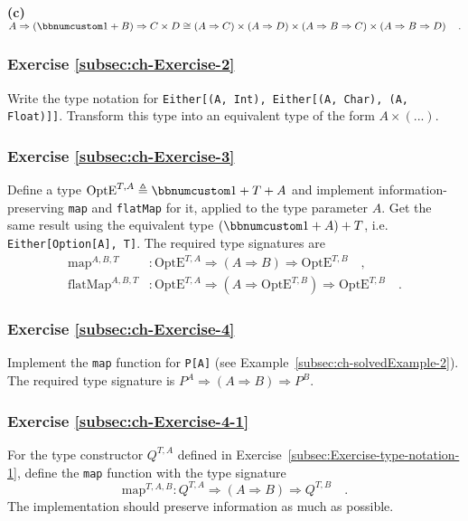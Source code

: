 \textbf{(c)} $A\Rightarrow\left(\bbnum 1+B\right)\Rightarrow C\times D\cong\left(A\Rightarrow C\right)\times\left(A\Rightarrow D\right)\times\left(A\Rightarrow B\Rightarrow C\right)\times\left(A\Rightarrow B\Rightarrow D\right)\quad.$

\subsubsection{Exercise \label{subsec:ch-Exercise-2}\ref{subsec:ch-Exercise-2}}

Write the type notation for \lstinline!Either[(A, Int), Either[(A, Char), (A, Float)]]!.
Transform this type into an equivalent type of the form $A\times(...)$.

\subsubsection{Exercise \label{subsec:ch-Exercise-3}\ref{subsec:ch-Exercise-3}}

Define a type $\text{OptE}^{T,A}\triangleq\bbnum 1+T+A$ and implement
information-preserving \lstinline!map! and \lstinline!flatMap! for
it, applied to the type parameter $A$. Get the same result using
the equivalent type $(\bbnum 1+A)+T$, i.e. \lstinline!Either[Option[A], T]!.
The required type signatures are
\begin{align*}
\text{map}^{A,B,T} & :\text{OptE}^{T,A}\Rightarrow\left(A\Rightarrow B\right)\Rightarrow\text{OptE}^{T,B}\quad,\\
\text{flatMap}^{A,B,T} & :\text{OptE}^{T,A}\Rightarrow(A\Rightarrow\text{OptE}^{T,B})\Rightarrow\text{OptE}^{T,B}\quad.
\end{align*}


\subsubsection{Exercise \label{subsec:ch-Exercise-4}\ref{subsec:ch-Exercise-4}}

Implement the \lstinline!map! function for \lstinline!P[A]! (see
Example~\ref{subsec:ch-solvedExample-2}). The required type signature
is $P^{A}\Rightarrow\left(A\Rightarrow B\right)\Rightarrow P^{B}$.

\subsubsection{Exercise \label{subsec:ch-Exercise-4-1}\ref{subsec:ch-Exercise-4-1}}

For the type constructor $Q^{T,A}$ defined in Exercise~\ref{subsec:Exercise-type-notation-1},
define the \lstinline!map! function with the type signature
\[
\text{map}^{T,A,B}:Q^{T,A}\Rightarrow\left(A\Rightarrow B\right)\Rightarrow Q^{T,B}\quad.
\]
The implementation should preserve information as much as possible.

